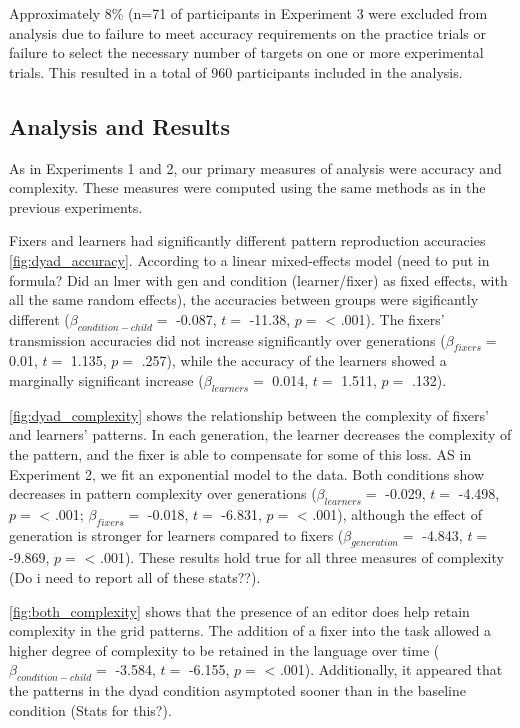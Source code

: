 \documentclass[10pt, letterpaper]{article}
\begin{document}
Approximately 8\% (n=71 of participants in Experiment 3 were excluded
from analysis due to failure to meet accuracy requirements on the
practice trials or failure to select the necessary number of targets on
one or more experimental trials. This resulted in a total of 960
participants included in the analysis.

\subsection{Analysis and Results}\label{analysis-and-results}

As in Experiments 1 and 2, our primary measures of analysis were
accuracy and complexity. These measures were computed using the same
methods as in the previous experiments.

Fixers and learners had significantly different pattern reproduction
accuracies \ref{fig:dyad_accuracy}. According to a linear mixed-effects
model (need to put in formula? Did an lmer with gen and condition
(learner/fixer) as fixed effects, with all the same random effects), the
accuracies between groups were sigificantly different
(\(\beta_{condition-child} =\) -0.087, \(t =\) -11.38, \(p =\)
\textless{} .001). The fixers' transmission accuracies did not increase
significantly over generations (\(\beta_{fixers} =\) 0.01, \(t =\)
1.135, \(p =\) .257), while the accuracy of the learners showed a
marginally significant increase (\(\beta_{learners} =\) 0.014, \(t =\)
1.511, \(p =\) .132).

\ref{fig:dyad_complexity} shows the relationship between the complexity
of fixers' and learners' patterns. In each generation, the learner
decreases the complexity of the pattern, and the fixer is able to
compensate for some of this loss. AS in Experiment 2, we fit an
exponential model to the data. Both conditions show decreases in pattern
complexity over generations (\(\beta_{learners} =\) -0.029, \(t =\)
-4.498, \(p =\) \textless{} .001; \(\beta_{fixers} =\) -0.018, \(t =\)
-6.831, \(p =\) \textless{} .001), although the effect of generation is
stronger for learners compared to fixers (\(\beta_{generation} =\)
-4.843, \(t =\) -9.869, \(p =\) \textless{} .001). These results hold
true for all three measures of complexity (Do i need to report all of
these stats??).

\ref{fig:both_complexity} shows that the presence of an editor does help
retain complexity in the grid patterns. The addition of a fixer into the
task allowed a higher degree of complexity to be retained in the
language over time (\(\beta_{condition-child} =\) -3.584, \(t =\)
-6.155, \(p =\) \textless{} .001). Additionally, it appeared that the
patterns in the dyad condition asymptoted sooner than in the baseline
condition (Stats for this?).
\end{document}

